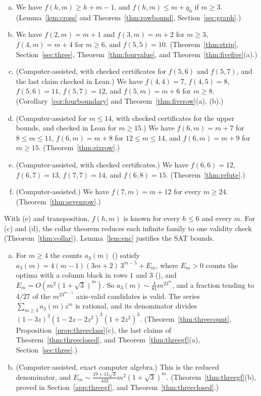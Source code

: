 \begin{introthm}\label{thm:A}
\leavevmode
\begin{enumerate}[(a)]
\item We have $f(h,m)\ge h+m-1$, and $f(h,m)\le m+q_h$ if $m\ge3$. \textup{(Lemma~\ref{lem:cross}
and Theorem~\ref{thm:rowbound}, Section~\ref{sec:graph}.)}
\item We have $f(2,m)=m+1$ and $f(3,m)=m+2$ for $m\ge3$, $f(4,m)=m+4$ for $m\ge6$,
and $f(5,5)=10$. \textup{(Theorem~\ref{thm:strip}, Section~\ref{sec:three},
Theorem~\ref{thm:fourvalue}, and Theorem~\ref{thm:fivefive}(a).)}
\item (Computer-assisted, with checked certificates for $f(5,6)$ and $f(5,7)$, and the last
claim checked in Lean.) We have $f(4,4)=7$, $f(4,5)=8$,
$f(5,6)=11$, $f(5,7)=12$, and $f(5,m)=m+6$ for $m\ge8$. \textup{(Corollary~\ref{cor:fourboundary}
and Theorem~\ref{thm:fiverow}(a), (b).)}
\item (Computer-assisted for $m\le14$, with checked certificates for the upper bounds, and
checked in Lean for $m\ge15$.) We have $f(6,m)=m+7$ for $8\le m\le11$, $f(6,m)=m+8$ for
$12\le m\le14$, and $f(6,m)=m+9$ for $m\ge15$. \textup{(Theorem~\ref{thm:sixrow}.)}
\item (Computer-assisted, with checked certificates.) We have $f(6,6)=12$,
$f(6,7)=13$, $f(7,7)=14$, and $f(6,8)=15$. \textup{(Theorem~\ref{thm:refute}.)}
\item (Computer-assisted.) We have $f(7,m)=m+12$ for every $m\ge24$.
\textup{(Theorem~\ref{thm:sevenrow}.)}
\end{enumerate}
\end{introthm}

With (e) and transposition, $f(h,m)$ is known for every $h\le6$ and every $m$.
For (c) and (d), the collar theorem reduces each infinite family to
one validity check (Theorem~\ref{thm:collar}). Lemma~\ref{lem:enc}
justifies the SAT bounds.

\begin{introthm}\label{thm:B}
\leavevmode
\begin{enumerate}[(a)]
\item For $m\ge4$ the counts $a_3(m)$ \textup{(}\textup{)} satisfy $a_3(m)=4(m-1)(3m+2)\,3^{m-5}+E_m$, where $E_m>0$ counts the
optima with a column black in rows $1$ and $3$ (), and
$E_m=O(m^2(1+\sqrt3)^m)$. So $a_3(m)\sim\frac4{81}m^23^m$, and a fraction tending to $4/27$
of the $m^23^{m-1}$ axis-valid candidates is valid. The series $\sum_{m\ge3}a_3(m)z^m$ is
rational, and its denominator divides $(1-3z)^3(1-2z-2z^2)^3(1+2z^2)^3$.
\textup{(Theorem~\ref{thm:threecount}, Proposition~\ref{prop:threeclass}(c), the last claims of
Theorem~\ref{thm:threeclosed}, and Theorem~\ref{thm:threegf}(a), Section~\ref{sec:three}.)}
\item (Computer-assisted, exact computer algebra.) This is the reduced denominator,
and $E_m\sim\frac{19+11\sqrt3}{432}m^2(1+\sqrt3)^m$. \textup{(Theorem~\ref{thm:threegf}(b),
proved in Section~\ref{app:threegf}, and Theorem~\ref{thm:threeclosed}.)}
\end{enumerate}
\end{introthm}

